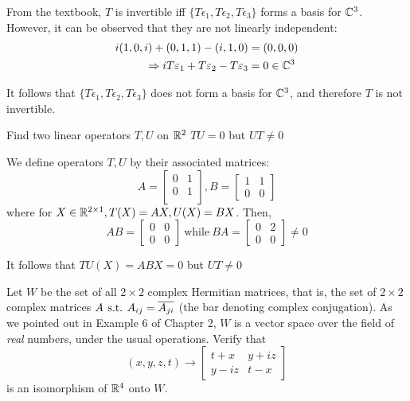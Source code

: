 \documentclass[a4paper, 11pt]{article}
\begin{document}
\begin{solution}
    From the textbook, \(T\) is invertible iff \(\{T\epsilon_1, T\epsilon_2, T\epsilon_3\}\) forms a basis for \(\mathbb{C}^3\). However, it can be observed that they are not linearly independent: \begin{align*}
        i(1, 0, i) + (0, 1, 1) - (i, 1, 0) &= (0, 0, 0) \\
        \Rightarrow iT\varepsilon_1 + T\varepsilon_2 - T\varepsilon_3 &= 0 \in \mathbb{C}^3
    \end{align*}

    It follows that \(\{T\epsilon_1, T\epsilon_2, T\epsilon_3\}\) does not form a basis for \(\mathbb{C}^3\), and therefore \(T\) is not invertible.
\end{solution}
\begin{problem} 
    Find two linear operators \(T, U\) on \(\mathbb{R}^2\) \st \(TU = 0\) but \(UT \neq 0\)
\end{problem}
\begin{solution}
    We define operators \(T, U\) by their associated matrices: \[
    A = \left[\begin{array}{cc}
    0 & 1 \\
    0 & 1 \\
    \end{array}\right], B = \left[\begin{array}{cc}
    1 & 1 \\
    0 & 0
    \end{array}\right]
    \]
    where for \(X \in \mathbb{R}^{2\times 1}, T(X) = AX, U(X) = BX\). Then, \[
    AB = \left[\begin{array}{cc}
    0 & 0 \\
    0 & 0
    \end{array}\right] \:\text{while}\: BA = \left[\begin{array}{cc}
        0 & 2 \\
        0 & 0
        \end{array}\right] \neq 0
    \]

    It follows that \(TU(X) = ABX = 0\) but \(UT \neq 0\)
\end{solution}
\begin{problem} 
    Let \(W\) be the set of all \(2 \times 2\) complex Hermitian matrices, that is, the set of \(2 \times 2\) complex matrices \(A \hspace*{4pt}\text{s.t.}\hspace*{4pt} A_{ij} = \overline{A_{ji}}\) (the bar denoting complex conjugation). As we pointed out in Example 6 of Chapter 2, \(W\) is a vector space over the field of \textit{real} numbers, under the usual operations. Verify that \[
    (x, y, z, t) \to \left[\begin{array}{cc}
    t + x & y + iz \\
    y - iz & t -x
    \end{array}\right]
    \]
    is an isomorphism of \(\mathbb{R}^4\) onto \(W\).
\end{problem}
\end{document}

